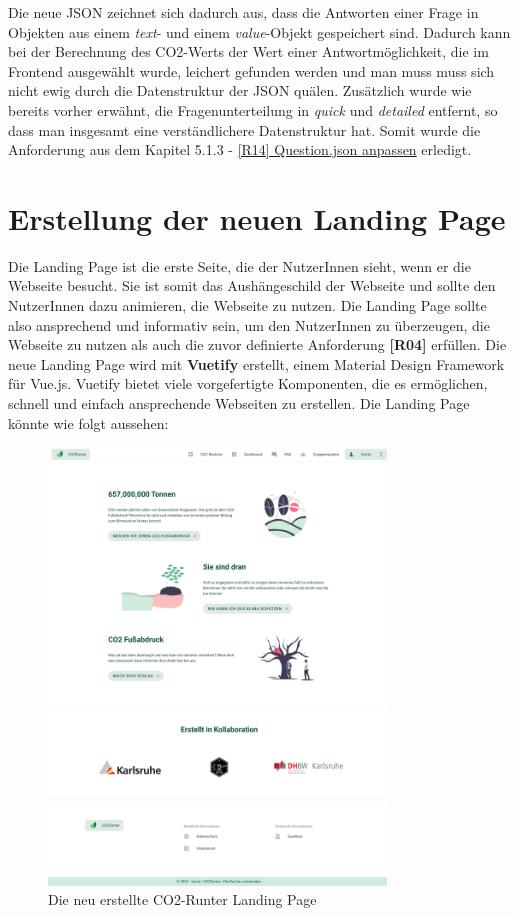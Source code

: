 Die neue \acs{JSON} zeichnet sich dadurch aus, dass die Antworten einer Frage in Objekten aus einem \textit{text}- und einem \textit{value}-Objekt gespeichert sind.
Dadurch kann bei der Berechnung des CO2-Werts der Wert einer Antwortmöglichkeit, die im Frontend ausgewählt wurde, leichert gefunden werden und man muss muss sich nicht ewig durch die Datenstruktur der \acs{JSON} quälen.
Zusätzlich wurde wie bereits vorher erwähnt, die Fragenunterteilung in \textit{quick} und \textit{detailed} entfernt, so dass man insgesamt eine verständlichere Datenstruktur hat.
Somit wurde die Anforderung aus dem Kapitel 5.1.3 - \hyperref[sec:questions-json-anpassen]{[R14] Question.json anpassen} erledigt.

\section{Erstellung der neuen Landing Page}

Die Landing Page ist die erste Seite, die der NutzerInnen sieht, wenn er die Webseite besucht.
Sie ist somit das Aushängeschild der Webseite und sollte den NutzerInnen dazu animieren, die Webseite zu nutzen.
Die Landing Page sollte also ansprechend und informativ sein, um den NutzerInnen zu überzeugen, die Webseite zu nutzen als auch die zuvor definierte Anforderung \textbf{[R04]} erfüllen.
Die neue Landing Page wird mit \textbf{Vuetify} erstellt, einem Material Design Framework für Vue.js.
Vuetify bietet viele vorgefertigte Komponenten, die es ermöglichen, schnell und einfach ansprechende Webseiten zu erstellen.
Die Landing Page könnte wie folgt aussehen:

\begin{figure}[H]
    \centering
    \includegraphics[width=0.8\textwidth]{images/06/HomePage-Design.jpeg}
    \caption{Die neu erstellte CO2-Runter Landing Page}
    \label{fig:new-co2runter-homepage-design}
\end{figure}

